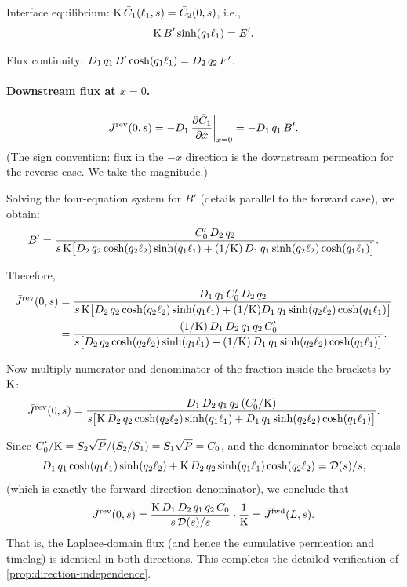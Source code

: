 Interface equilibrium: $\mathrm{K}\,\bar{C}_1(\ell_{1},s) = \bar{C}_2(0,s)$, i.e.,
\begin{equation}
  \label{eq:rev-interface-eq}
  \mathrm{K}\,B'\sinh(q_1\ell_{1}) = E'.
\end{equation}

Flux continuity:
$D_{1}\,q_1\,B'\cosh(q_1\ell_{1}) = D_{2}\,q_2\,F'$.

\paragraph{Downstream flux at $x = 0$.}
\begin{equation}
  \bar{J}^{\mathrm{rev}}(0,s) = -D_{1}\,\pdv{\bar{C}_1}{x}\bigg|_{x=0}
  = -D_{1}\,q_1\,B'.
\end{equation}
(The sign convention: flux in the $-x$ direction is the downstream permeation
for the reverse case.  We take the magnitude.)

Solving the four-equation system for $B'$ (details parallel to the forward
case), we obtain:
\begin{equation}
  B' = \frac{C_0'\,D_{2}\,q_2}
  {s\,\mathrm{K}\bigl[D_{2}\,q_2\cosh(q_2\ell_{2})\sinh(q_1\ell_{1})
    + (1/\mathrm{K})\,D_{1}\,q_1\sinh(q_2\ell_{2})\cosh(q_1\ell_{1})\bigr]}.
\end{equation}

Therefore,
\begin{align}
  \bar{J}^{\mathrm{rev}}(0,s)
  &= \frac{D_{1}\,q_1\,C_0'\,D_{2}\,q_2}
  {s\,\mathrm{K}\bigl[D_{2}\,q_2\cosh(q_2\ell_{2})\sinh(q_1\ell_{1})
    + (1/\mathrm{K})D_{1}\,q_1\sinh(q_2\ell_{2})\cosh(q_1\ell_{1})\bigr]}
  \notag\\
  &= \frac{(1/\mathrm{K})\,D_{1}\,D_{2}\,q_1\,q_2\,C_0'}
  {s\bigl[D_{2}\,q_2\cosh(q_2\ell_{2})\sinh(q_1\ell_{1})
    + (1/\mathrm{K})\,D_{1}\,q_1\sinh(q_2\ell_{2})\cosh(q_1\ell_{1})\bigr]}.
\end{align}

Now multiply numerator and denominator of the fraction inside the brackets by
$\mathrm{K}$:
\begin{equation}
  \bar{J}^{\mathrm{rev}}(0,s)
  = \frac{D_{1}\,D_{2}\,q_1\,q_2\,(C_0'/\mathrm{K})}
  {s\bigl[\mathrm{K}\,D_{2}\,q_2\cosh(q_2\ell_{2})\sinh(q_1\ell_{1})
    + D_{1}\,q_1\sinh(q_2\ell_{2})\cosh(q_1\ell_{1})\bigr]}.
\end{equation}

Since $C_0'/\mathrm{K} = S_{2}\sqrt{P}/(S_{2}/S_{1}) = S_{1}\sqrt{P} = C_0$,
and the denominator bracket equals
\begin{equation}
  D_{1}\,q_1\cosh(q_1\ell_{1})\sinh(q_2\ell_{2})
  + \mathrm{K}\,D_{2}\,q_2\sinh(q_1\ell_{1})\cosh(q_2\ell_{2})
  = \mathcal{D}(s)/s,
\end{equation}
(which is exactly the forward-direction denominator), we conclude that
\begin{equation}
  \bar{J}^{\mathrm{rev}}(0,s) = \frac{\mathrm{K}\,D_{1}\,D_{2}\,q_1\,q_2\,C_0}
  {s\,\mathcal{D}(s)/s}
  \cdot\frac{1}{\mathrm{K}} = \bar{J}^{\mathrm{fwd}}(L,s).
\end{equation}
That is, the Laplace-domain flux (and hence the cumulative permeation and
timelag) is identical in both directions.  This completes the detailed
verification of \cref{prop:direction-independence}.

